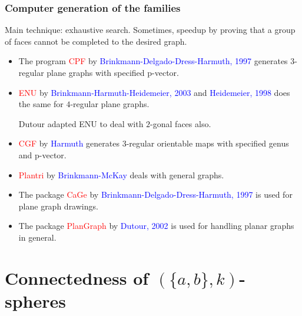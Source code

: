 \documentclass{beamer}
\begin{document}
\begin{frame}\frametitle{Computer generation of the families}
\vspace{-2mm}
Main technique: exhaustive search. Sometimes, speedup by proving that a 
group of faces cannot be completed to the desired 
graph.
\begin{itemize}


\item The program  \textcolor{red}{CPF} by \textcolor{blue}{Brinkmann-Delgado-Dress-Harmuth, 1997} 
generates $3$-regular plane graphs with specified p-vector.
\item \textcolor{red}{ENU} by \textcolor{blue}{Brinkmann-Harmuth-Heidemeier, 2003}
and \textcolor{blue}{Heidemeier, 1998}  does the same for $4$-regular 
plane graphs.

Dutour adapted ENU to deal with $2$-gonal faces also.

\item \textcolor{red}{CGF}
by \textcolor{blue}{Harmuth} generates 3-regular  orientable maps with specified genus
and p-vector.

\item \textcolor{red}{Plantri} by
\textcolor{blue}{Brinkmann-McKay} deals with  general graphs.

\item The package \textcolor{red}{CaGe} by 
\textcolor{blue}{Brinkmann-Delgado-Dress-Harmuth, 1997}
 is used for plane graph drawings.
\item The package \textcolor{red}{PlanGraph} by
 \textcolor{blue}{Dutour, 2002} is used for handling planar graphs in 
general.


\end{itemize}
\end{frame}

\section[]{Connectedness  of $(\{a,b\},k)$-spheres}


\end{document}
